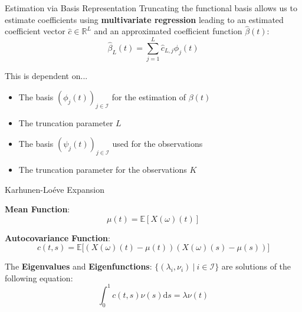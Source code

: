 \documentclass{beamer}
\begin{document}
	\begin{frame}{Estimation via Basis Representation}
		Truncating the functional basis allows us to estimate coefficients using \textbf{multivariate regression} leading to an estimated coefficient vector $\hat{c} \in \mathbb{R}^L$ and an approximated coefficient function $\hat{\beta}(t)$:
		\vspace{-0.2cm}
		$$\hat{\beta}_L(t) = \sum_{j = 1}^{L} \hat{c}_{L,j} \phi_j(t)$$
		
		This is dependent on...\vspace{-0.2cm}
		\begin{multicols}{2}
			\begin{itemize}
				\item The basis $(\phi_j(t))_{j \in \mathcal{I}}$ for the estimation of $\beta(t)$
				\item The truncation parameter $L$\vfill\null
				\item The basis $(\psi_j(t))_{j \in \mathcal{I}}$ used for the observations
				\item The truncation parameter for the observations $K$
			\end{itemize}
		\end{multicols}

	\end{frame}

	\begin{frame}{Karhunen-Lo\'{e}ve Expansion}
		
		\textbf{Mean Function}: $$\mu(t) = \mathbb{E}\left[ X(\omega)(t) \right]$$

		\textbf{Autocovariance Function}: $$c(t,s) = \mathbb{E}\big[ \left( X(\omega)(t) - \mu(t) \right) \left( X(\omega)(s) - \mu(s) \right) \big]$$
		
		The \textbf{Eigenvalues} and \textbf{Eigenfunctions}: $\{(\lambda_i, \nu_i) \: \vert \: i \in \mathcal{I}\}$  are solutions of the following equation:
		$$ \int_{0}^{1}c(t,s)\nu(s) \mathrm{d}s = \lambda \nu(t) $$
	\end{frame}
	
\end{document}
